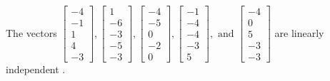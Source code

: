 \begin{exercise}
\begin{exerciseStatement}
  \end{exerciseStatement}
  \begin{exerciseAnswer}
   The vectors \(\left[\begin{array}{r}
-4 \\
-1 \\
1 \\
4 \\
-3
\end{array}\right] , \left[\begin{array}{r}
1 \\
-6 \\
-3 \\
-5 \\
-3
\end{array}\right] , \left[\begin{array}{r}
-4 \\
-5 \\
0 \\
-2 \\
0
\end{array}\right] , \left[\begin{array}{r}
-1 \\
-4 \\
-4 \\
-3 \\
5
\end{array}\right] , \text{ and } \left[\begin{array}{r}
-4 \\
0 \\
5 \\
-3 \\
-3
\end{array}\right]\) are 
  	 linearly independent  .
  


  \end{exerciseAnswer}
\end{exercise}